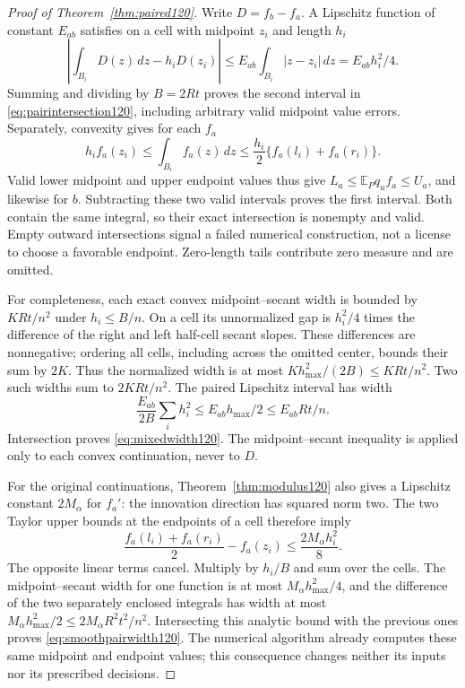 \begin{proof}[Proof of Theorem~\ref{thm:paired120}]
Write $D=f_b-f_a$.  A Lipschitz function of constant $E_{ab}$
satisfies on a cell with midpoint $z_i$ and length $h_i$
\[
 \left|\int_{B_i}D(z)\,dz-h_iD(z_i)\right|
 \le E_{ab}\int_{B_i}|z-z_i|\,dz
 =E_{ab}h_i^2/4.
\]
Summing and dividing by $B=2Rt$ proves the second interval in
\eqref{eq:pairintersection120}, including arbitrary valid midpoint
value errors.  Separately, convexity gives for each $f_a$
\[
 h_if_a(z_i)\le\int_{B_i}f_a(z)\,dz
       \le\frac{h_i}{2}\{f_a(l_i)+f_a(r_i)\}.
\]
Valid lower midpoint and upper endpoint values thus give
$L_a\le\mathbb E_Pq_uf_a\le U_a$, and likewise for $b$.
Subtracting these two valid intervals proves the first interval.
Both contain the same integral, so their exact intersection is
nonempty and valid.  Empty outward intersections signal a failed
numerical construction, not a license to choose a favorable endpoint.
Zero-length tails contribute zero measure and are omitted.

For completeness, each exact convex midpoint--secant width is
bounded by $KRt/n^2$ under $h_i\le B/n$.  On a cell its unnormalized
gap is $h_i^2/4$ times the difference of the right and left
half-cell secant slopes.  These differences are nonnegative; ordering
all cells, including across the omitted center, bounds their sum by
$2K$.  Thus the normalized width is at most
$Kh_{\max}^2/(2B)\le KRt/n^2$.
Two such widths sum to $2KRt/n^2$.
The paired Lipschitz interval has width
\[
 \frac{E_{ab}}{2B}\sum_i h_i^2
 \le E_{ab}h_{\max}/2\le E_{ab}Rt/n.
\]
Intersection proves \eqref{eq:mixedwidth120}.
The midpoint--secant inequality is applied only to each convex
continuation, never to $D$.

For the original continuations, Theorem~\ref{thm:modulus120}
also gives a Lipschitz constant $2M_\alpha$ for $f_a'$:
the innovation direction has squared norm two.
The two Taylor upper bounds at the endpoints of a cell
therefore imply
\[
 \frac{f_a(l_i)+f_a(r_i)}2-f_a(z_i)
 \le \frac{2M_\alpha h_i^2}{8}.
\]
The opposite linear terms cancel.  Multiply by $h_i/B$
and sum over the cells.  The midpoint--secant width for
one function is at most $M_\alpha h_{\max}^2/4$,
and the difference of the two separately enclosed
integrals has width at most
$M_\alpha h_{\max}^2/2\le2M_\alpha R^2t^2/n^2$.
Intersecting this analytic bound with the previous
ones proves \eqref{eq:smoothpairwidth120}.
The numerical algorithm already computes these same
midpoint and endpoint values; this consequence changes
neither its inputs nor its prescribed decisions.


\end{proof}
